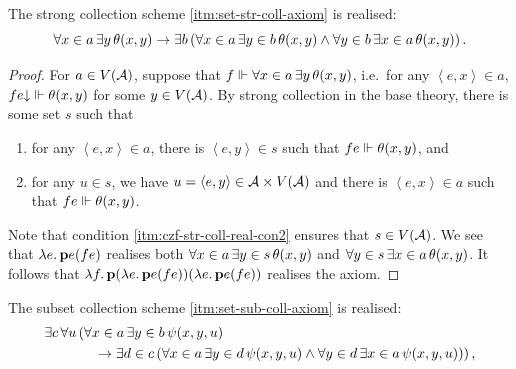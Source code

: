 \documentclass[12pt,openany]{book}
\theoremstyle{plain}
\theoremstyle{definition}
\newcommand\uplabel[1]{\textup{(#1)}}
\newcommand\tuple[1]{\left\langle #1 \right\rangle}
\newcommand\opA[1]{\mathop{\forall #1}}
\newcommand\opE[1]{\mathop{\exists #1}}
\newcommand\oplam[1]{\mathop{\lambda #1.}}
\newcommand\bp{\mathbf{p}}
\begin{document}
\begin{lemma}
  \label{lem:czf-str-coll-real}
  The strong collection scheme \ref{itm:set-str-coll-axiom} is realised:
  \[\opA{x \in a} \opE{y} \theta\mleft(x, y\mright) \rightarrow \opE{b} \left(\opA{x \in a} \opE{y \in b} \theta\mleft(x, y\mright) \land \opA{y \in b} \opE{x \in a} \theta\mleft(x, y\mright)\right).\]
\end{lemma}

\begin{proof}
  For $a \in V\mleft(\mathcal{A}\mright)$, suppose that $f \Vdash \opA{x \in a} \opE{y} \theta\mleft(x, y\mright)$, i.e.\ for any $\tuple{e, x} \in a$, $fe {\downarrow} \Vdash \theta\mleft(x, y\mright)$ for some $y \in V\mleft(\mathcal{A}\mright)$. By strong collection in the base theory, there is some set $s$ such that
  \begin{enumerate}[label=\uplabel{\roman*}]
    \item for any $\tuple{e, x} \in a$, there is $\tuple{e, y} \in s$ such that $fe \Vdash \theta\mleft(x, y\mright)$, and
    \item \label{itm:czf-str-coll-real-con2} for any $u \in s$, we have $u = \tuple{e, y} \in \mathcal{A} \times V\mleft(\mathcal{A}\mright)$ and there is $\tuple{e, x} \in a$ such that $fe \Vdash \theta\mleft(x, y\mright)$.
  \end{enumerate}
  Note that condition \ref{itm:czf-str-coll-real-con2} ensures that $s \in V\mleft(\mathcal{A}\mright)$. We see that $\oplam{e} \bp e \mleft(fe\mright)$ realises both $\opA{x \in a} \opE{y \in s} \theta\mleft(x, y\mright)$ and $\opA{y \in s} \opE{x \in a} \theta\mleft(x, y\mright)$. It follows that $\oplam{f} \bp \mleft(\oplam{e} \bp e \mleft(fe\mright)\mright) \mleft(\oplam{e} \bp e \mleft(fe\mright)\mright)$ realises the axiom.
\end{proof}

\begin{lemma}
  \label{lem:czf-sub-coll-real}
  The subset collection scheme \ref{itm:set-sub-coll-axiom} is realised:
  \begin{align*}
    \opE{c} \opA{u} & \left(\opA{x \in a} \opE{y \in b} \psi\mleft(x, y, u\mright)\right.                                                                                                               \\
                    & \quad \left.{} \rightarrow \opE{d \in c} \left(\opA{x \in a} \opE{y \in d} \psi\mleft(x, y, u\mright) \land \opA{y \in d} \opE{x \in a} \psi\mleft(x, y, u\mright)\right)\right),
  \end{align*}
\end{lemma}
\end{document}
